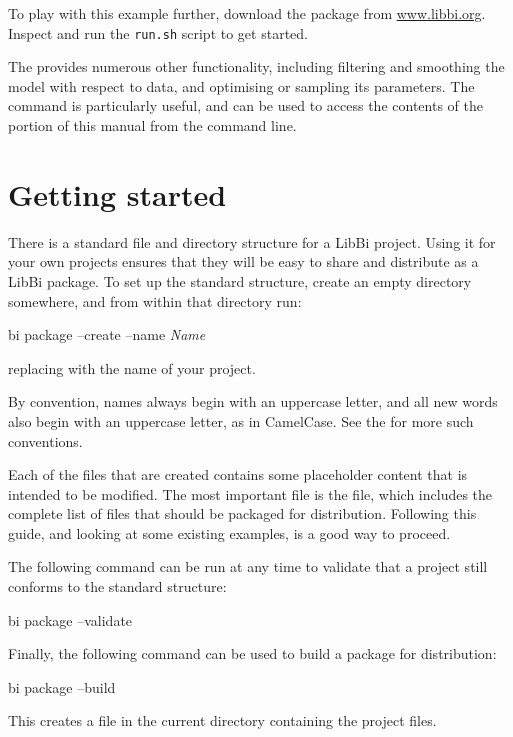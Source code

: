 To play with this example further, download the  package from
\url{www.libbi.org}. Inspect and run the \texttt{run.sh} script to get
started.

The  provides numerous
other functionality, including filtering and smoothing the model with respect
to data, and optimising or sampling its parameters. The 
command is particularly useful, and can be used to access the contents of the
 portion of this manual from the
command line.

\section{Getting started}\label{Getting_started}

There is a standard file and directory structure for a LibBi project. Using it
for your own projects ensures that they will be easy to share and distribute
as a LibBi package. To set up the standard structure, create an empty
directory somewhere, and from within that directory run:
\begin{cmdcode}
bi package --create --name \emph{Name}
\end{cmdcode}
replacing  with the name of your project.

\begin{tip}
By convention, names always begin with an uppercase letter, and all new words
also begin with an uppercase letter, as in CamelCase. See the
 for more such conventions.
\end{tip}

Each of the files that are created contains some placeholder content that is
intended to be modified. The most important file is the  file,
which includes the complete list of files that should be packaged for
distribution. Following this guide, and looking at some existing examples, is
a good way to proceed.

The following command can be run at any time to validate that a project still
conforms to the standard structure:
\begin{cmdcode}
bi package --validate
\end{cmdcode}

Finally, the following command can be used to build a package for
distribution:
\begin{cmdcode}
bi package --build
\end{cmdcode}
This creates a  file in the current directory containing the
project files.

